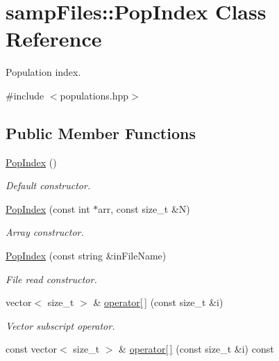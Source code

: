 \hypertarget{classsamp_files_1_1_pop_index}{}\section{samp\+Files\+:\+:Pop\+Index Class Reference}
\label{classsamp_files_1_1_pop_index}


Population index.  




{\ttfamily \#include $<$populations.\+hpp$>$}

\subsection*{Public Member Functions}
\begin{DoxyCompactItemize}
\item 
\mbox{\label{classsamp_files_1_1_pop_index_a4490c400619ba5725c6e14bfb5bcc069}} 
\hyperlink{classsamp_files_1_1_pop_index_a4490c400619ba5725c6e14bfb5bcc069}{Pop\+Index} ()
\begin{DoxyCompactList}\small\item\em Default constructor. \end{DoxyCompactList}\item 
\hyperlink{classsamp_files_1_1_pop_index_a27367217cfb5f85abda425baa1d755b9}{Pop\+Index} (const int $\ast$arr, const size\+\_\+t \&N)
\begin{DoxyCompactList}\small\item\em Array constructor. \end{DoxyCompactList}\item 
\hyperlink{classsamp_files_1_1_pop_index_aaf4cec726d9befe823c7d6ff4d36d5ce}{Pop\+Index} (const string \&in\+File\+Name)
\begin{DoxyCompactList}\small\item\em File read constructor. \end{DoxyCompactList}\item 
vector$<$ size\+\_\+t $>$ \& \hyperlink{classsamp_files_1_1_pop_index_ad3e3ff5964bea3b17bf54c2fc3af231c}{operator\mbox{[}$\,$\mbox{]}} (const size\+\_\+t \&i)
\begin{DoxyCompactList}\small\item\em Vector subscript operator. \end{DoxyCompactList}\item 
const vector$<$ size\+\_\+t $>$ \& \hyperlink{classsamp_files_1_1_pop_index_a56dea775828fc2a6b8b5b110429f67a5}{operator\mbox{[}$\,$\mbox{]}} (const size\+\_\+t \&i) const

\end{DoxyCompactItemize}
